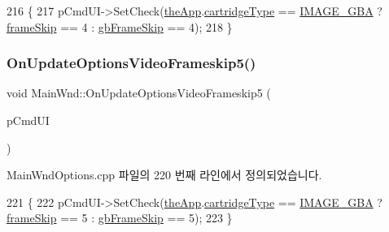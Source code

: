 \begin{DoxyCode}
216 \{
217   pCmdUI->SetCheck(\mbox{\hyperlink{_v_b_a_8cpp_a8095a9d06b37a7efe3723f3218ad8fb3}{theApp}}.\mbox{\hyperlink{class_v_b_a_af300759fcbc7eeb00ce73f956fc5ddb7}{cartridgeType}} == \mbox{\hyperlink{_util_8h_aef8b88d56fdf9a25f990a68d80c014d8a25f0ac1f3a37d568346fedece32e4bfb}{IMAGE\_GBA}} ? 
      \mbox{\hyperlink{_globals_8cpp_a668e22999d7fcea3ed14130fd680b795}{frameSkip}} == 4 : \mbox{\hyperlink{_g_b_8cpp_a2139360d32d74969f470ef05414ecaf8}{gbFrameSkip}} == 4);
218 \}
\end{DoxyCode}
\mbox{\label{class_main_wnd_ae097e4242099e9486304041874aea0dc}} 
\subsubsection{\texorpdfstring{On\+Update\+Options\+Video\+Frameskip5()}{OnUpdateOptionsVideoFrameskip5()}}
{\footnotesize\ttfamily void Main\+Wnd\+::\+On\+Update\+Options\+Video\+Frameskip5 (\begin{DoxyParamCaption}\item[{C\+Cmd\+UI $\ast$}]{p\+Cmd\+UI }\end{DoxyParamCaption})\hspace{0.3cm}{\ttfamily [protected]}}



Main\+Wnd\+Options.\+cpp 파일의 220 번째 라인에서 정의되었습니다.


\begin{DoxyCode}
221 \{
222   pCmdUI->SetCheck(\mbox{\hyperlink{_v_b_a_8cpp_a8095a9d06b37a7efe3723f3218ad8fb3}{theApp}}.\mbox{\hyperlink{class_v_b_a_af300759fcbc7eeb00ce73f956fc5ddb7}{cartridgeType}} == \mbox{\hyperlink{_util_8h_aef8b88d56fdf9a25f990a68d80c014d8a25f0ac1f3a37d568346fedece32e4bfb}{IMAGE\_GBA}} ? 
      \mbox{\hyperlink{_globals_8cpp_a668e22999d7fcea3ed14130fd680b795}{frameSkip}} == 5 : \mbox{\hyperlink{_g_b_8cpp_a2139360d32d74969f470ef05414ecaf8}{gbFrameSkip}} == 5);
223 \}
\end{DoxyCode}
\mbox{\label{class_main_wnd_a741975d106105e7fb2dd0e9b6626b972}} 
